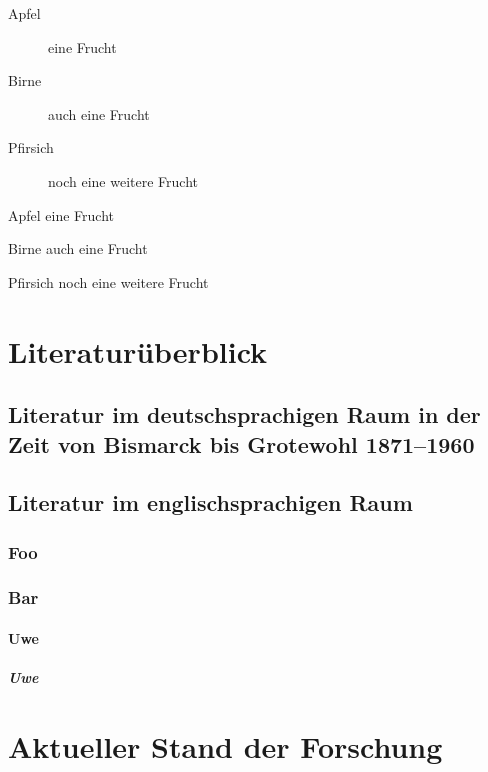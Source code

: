 \documentclass[ngerman,12pt,parskip=half]{scrreprt}
\begin{document}
\begin{description}
\item[Apfel] eine Frucht
\item[Birne] auch eine Frucht
\item[Pfirsich] noch eine weitere Frucht
\end{description}

\begin{compactdesc}
\item[Apfel] eine Frucht
\item[Birne] auch eine Frucht
\item[Pfirsich] noch eine weitere Frucht
\end{compactdesc}


\section{Literaturüberblick}

\blindtext[15]

\subsection[Literatur im deutschsprachigen Raum]{Literatur im deutschsprachigen Raum in der Zeit von Bismarck bis Grotewohl 1871--1960}

\blindtext[5]

\subsection{Literatur im englischsprachigen Raum}

\blindtext[5]

\subsubsection{Foo}

\blindtext[5]

\subsubsection{Bar}

\blindtext[5]

\paragraph{Uwe} \blindtext

\subparagraph{Uwe} \blindtext

\section{Aktueller Stand der Forschung}
\end{document}
